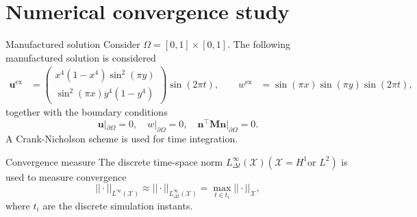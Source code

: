 \documentclass[aspectratio=169]{beamer}
\begin{document}
\section{Numerical convergence study}

\begin{frame}{Manufactured solution}
	Consider $\Omega= [0,1] \times [0, 1]$. The following manufactured solution is considered
	\begin{equation*}
		\begin{aligned}
			\bm{u}^{\text{ex}} &= \begin{pmatrix}
				x^4 (1-x^4)\sin^2(\pi y) \\
				\sin^2(\pi x) y^4 (1-y^4)
			\end{pmatrix} \sin(2\pi t), \qquad
			w^{\text{ex}} &= \sin(\pi x)\sin(\pi y)\sin(2 \pi t), 
		\end{aligned}
	\end{equation*}
	together with the boundary conditions
	\begin{equation*}
		\bm{u}|_{\partial\Omega} = 0, \quad w|_{\partial\Omega}=0, \quad \bm{n}^\top\bm{M}\bm{n}|_{\partial\Omega}=0.
	\end{equation*}
A Crank-Nicholson scheme is used for time integration.
\begin{block}{Convergence measure}
	The discrete time-space norm $L^\infty_{\Delta t} (\mathcal{X}) (\mathcal{X} = H^1 \text{or } L^2)$ is used to measure convergence
	\[
	||\cdot ||_{L^\infty (\mathcal{X})} \approx || \cdot ||_{L^\infty_{\Delta t} (\mathcal{X})} = \max_{t \in t_i} ||\cdot||_{\mathcal{X}},
	\]
	where $t_i$ are the discrete simulation instants.
\end{block}

\end{frame}
\end{document}
